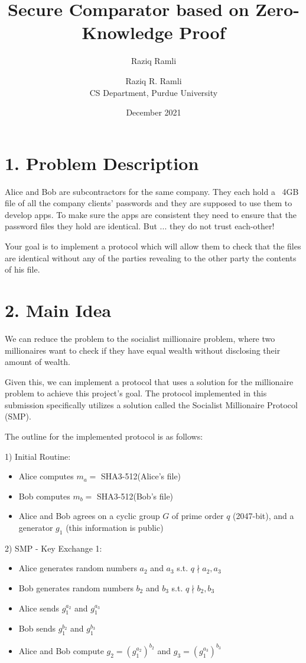 \documentclass{article}
\title{Secure Comparator based on Zero-Knowledge Proof}
\author{Raziq Ramli}
\date{December 2021}
\author{Raziq R. Ramli\\ CS Department, Purdue University}
\begin{document}
\maketitle

\section*{1. Problem Description}

Alice and Bob are subcontractors for the same company. 
They each hold a ~4GB file of all the company clients’ 
passwords and they are supposed to use them to develop 
apps. To make sure the apps are consistent they need 
to ensure that the password files they hold are 
identical. But ... they do not trust each-other!

Your goal is to implement a protocol which will allow 
them to check that the files are identical without any 
of the parties revealing to the other party the contents 
of his file.

\section*{2. Main Idea}

We can reduce the problem to the socialist millionaire problem, where
two millionaires want to check if they have equal wealth without disclosing 
their amount of wealth. 

Given this, we can implement a protocol that uses a solution for the 
millionaire problem to achieve this project's goal. The protocol 
implemented in this submission specifically utilizes a solution called 
the Socialist Millionaire Protocol (SMP).

The outline for the implemented protocol is as follows:

1) Initial Routine:

\begin{itemize}
  \item Alice computes $m_a = $ SHA3-512(Alice's file)
  \item Bob computes $m_b = $ SHA3-512(Bob's file)
  \item Alice and Bob agrees on a cyclic group $G$ of prime order $q$ (2047-bit), 
    and a generator $g_1$
    (this information is public)
\end{itemize}

2) SMP - Key Exchange 1:
\begin{itemize}
  \item Alice generates random numbers $a_2$ and $a_3$ s.t. $q \nmid a_2, a_3$
  \item Bob generates random numbers $b_2$ and $b_3$ s.t. $q \nmid b_2, b_3$
  \item Alice sends $g_1^{a_2}$ and $g_1^{a_3}$
  \item Bob sends $g_1^{b_2}$ and $g_1^{b_3}$
  \item Alice and Bob compute $g_2 = (g_1^{a_2})^{b_2}$ and $g_3 = (g_1^{a_3})^{b_3}$
\end{itemize}
\end{document}

